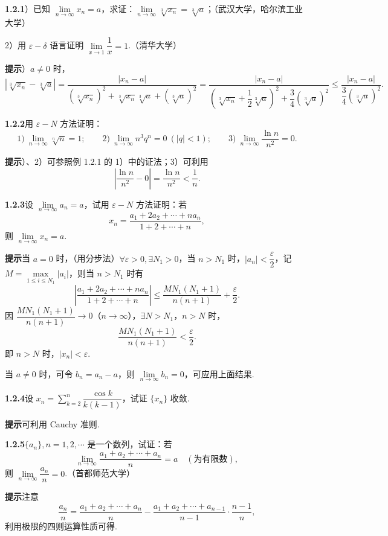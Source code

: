 \documentclass[UTF8,12pt,a4paper,fontset=fandol]{ctexart}
\begin{document}
\noindent\textbf{1.2.1}）已知 $\lim\limits_{n\to\infty}x_n=a$，求证：$\lim\limits_{n\to\infty}\sqrt[3]{x_n}=\sqrt[3]{a}$；（武汉大学，哈尔滨工业大学）

2）用 $\varepsilon-\delta$ 语言证明 $\lim\limits_{x\to1}\dfrac1x=1$.（清华大学）

\noindent\textbf{提示}）$a\ne0$ 时，
\[
\left|\sqrt[3]{x_n}-\sqrt[3]{a}\right|
=\frac{|x_n-a|}
{(\sqrt[3]{x_n})^2+\sqrt[3]{x_n}\sqrt[3]{a}+(\sqrt[3]{a})^2}
=\frac{|x_n-a|}
{\left(\sqrt[3]{x_n}+\dfrac12\sqrt[3]{a}\right)^2
+\dfrac34(\sqrt[3]{a})^2}
\le \frac{|x_n-a|}{\dfrac34(\sqrt[3]{a})^2}.
\]

\noindent\textbf{1.2.2}\quad 用 $\varepsilon-N$ 方法证明：
\[
1)\ \lim_{n\to\infty}\sqrt[n]{n}=1;\qquad
2)\ \lim_{n\to\infty}n^3q^n=0\ (|q|<1);\qquad
3)\ \lim_{n\to\infty}\frac{\ln n}{n^2}=0.
\]

\noindent\textbf{提示}）、2）可参照例 1.2.1 的 1）中的证法；3）可利用
\[
\left|\frac{\ln n}{n^2}-0\right|=\frac{\ln n}{n^2}<\frac1n.
\]

\noindent\textbf{1.2.3}\quad 设 $\lim\limits_{n\to\infty}a_n=a$，试用 $\varepsilon-N$ 方法证明：若
\[
  x_n=\frac{a_1+2a_2+\cdots+na_n}{1+2+\cdots+n},
\]
则 $\lim\limits_{n\to\infty}x_n=a$.

\noindent\textbf{提示}\quad 当 $a=0$ 时，（用分步法）$\forall\varepsilon>0,\exists N_1>0$，当 $n>N_1$ 时，$|a_n|<\dfrac{\varepsilon}{2}$，记 $M=\max\limits_{1\le i\le N_1}|a_i|$，则当 $n>N_1$ 时有
\[
\left|\frac{a_1+2a_2+\cdots+na_n}{1+2+\cdots+n}\right|
\le \frac{MN_1(N_1+1)}{n(n+1)}+\frac{\varepsilon}{2}.
\]
因 $\dfrac{MN_1(N_1+1)}{n(n+1)}\to0$（$n\to\infty$），$\exists N>N_1$，$n>N$ 时，
\[
  \frac{MN_1(N_1+1)}{n(n+1)}<\frac{\varepsilon}{2}.
\]
即 $n>N$ 时，$|x_n|<\varepsilon$.

当 $a\ne0$ 时，可令 $b_n=a_n-a$，则 $\lim\limits_{n\to\infty}b_n=0$，可应用上面结果.

\noindent\textbf{1.2.4}\quad 设 $x_n=\sum\limits_{k=2}^n\dfrac{\cos k}{k(k-1)}$，试证 $\{x_n\}$ 收敛.

\noindent\textbf{提示}\quad 可利用 Cauchy 准则.

\noindent\textbf{1.2.5}\quad $\{a_n\},n=1,2,\cdots$ 是一个数列，试证：若
\[
  \lim_{n\to\infty}\frac{a_1+a_2+\cdots+a_n}{n}=a\quad(\text{为有限数}),
\]
则 $\lim\limits_{n\to\infty}\dfrac{a_n}{n}=0$.（首都师范大学）

\noindent\textbf{提示}\quad 注意
\[
  \frac{a_n}{n}
  =\frac{a_1+a_2+\cdots+a_n}{n}
  -\frac{a_1+a_2+\cdots+a_{n-1}}{n-1}\cdot\frac{n-1}{n},
\]
利用极限的四则运算性质可得.
\end{document}
